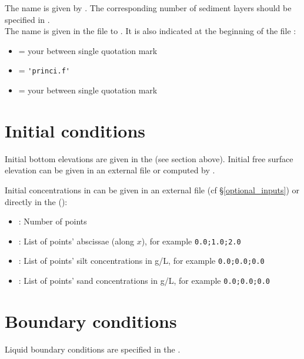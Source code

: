 The  name is given by .
The corresponding number of sediment layers should be specified in .\\

The  name is given in the \xcas file to \mascaret. It is also indicated at the beginning of the \cas file :
\begin{itemize}
	\item {} = your \xcas between single quotation mark
	\item {} = \verb|'princi.f'|
	\item {} = your  between single quotation mark
\end{itemize}

\section{Initial conditions}

Initial bottom elevations are given in the  (see section above).
Initial free surface elevation can be given in an external file or computed by \mascaret.

Initial concentrations in \Csuspension can be given in an external file (cf \S \ref{optional_inputs}) or directly in the \cas ():
\begin{itemize}
	\item {} : Number of points
	\item {} : List of points' abscissae (along $x$), for example \verb|0.0;1.0;2.0|
	\item {} : List of points' silt concentrations in g/L, for example \verb|0.0;0.0;0.0|
	\item {} : List of points' sand concentrations in g/L, for example \verb|0.0;0.0;0.0|
\end{itemize}

\section{Boundary conditions}

Liquid boundary conditions are specified in the \xcas.


